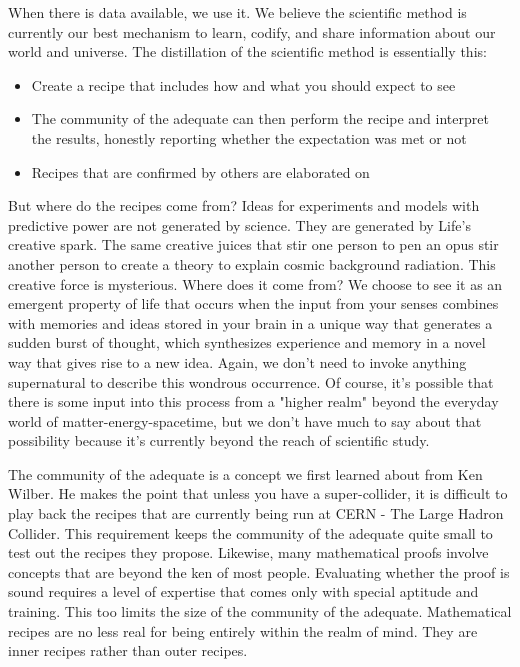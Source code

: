 \documentclass[ebook,11pt,openany,twoside,showtrims]{memoir}
\begin{document}
When there is data available, we use it. We believe the scientific method is
currently our best mechanism to learn, codify, and share information about our
world and universe. The distillation of the scientific method is essentially
this:
\begin{itemize}[\textbullet]
\item Create a recipe that includes how and what you should expect to see

\item The community of the adequate can then perform the recipe and interpret
the results, honestly reporting whether the expectation was met or not

\item Recipes that are confirmed by others are elaborated on
\end{itemize}

But where do the recipes come from? Ideas for experiments and models with
predictive power are not generated by science. They are generated by Life's
creative spark. The same creative juices that stir one person to pen an opus
stir another person to create a theory to explain cosmic background radiation.
This creative force is mysterious. Where does it come from? We choose to see it
as an emergent property of life that occurs when the input from your senses
combines with memories and ideas stored in your brain in a unique way that
generates a sudden burst of thought, which synthesizes experience and memory in
a novel way that gives rise to a new idea. Again, we don't need to invoke
anything supernatural to describe this wondrous occurrence. Of course, it's
possible that there is some input into this process from a "higher realm"
beyond the everyday world of matter-energy-spacetime, but we don't have much to
say about that possibility because it's currently beyond the reach of
scientific study.

The community of the adequate is a concept we first learned about from Ken
Wilber. He makes the point that unless you have a super-collider, it is
difficult to play back the recipes that are currently being run at CERN - The
Large Hadron Collider. This requirement keeps the community of the adequate
quite small to test out the recipes they propose. Likewise, many mathematical
proofs involve concepts that are beyond the ken of most people. Evaluating
whether the proof is sound requires a level of expertise that comes only with
special aptitude and training. This too limits the size of the community of the
adequate. Mathematical recipes are no less real for being entirely within the
realm of mind. They are inner recipes rather than outer recipes.
\end{document}
